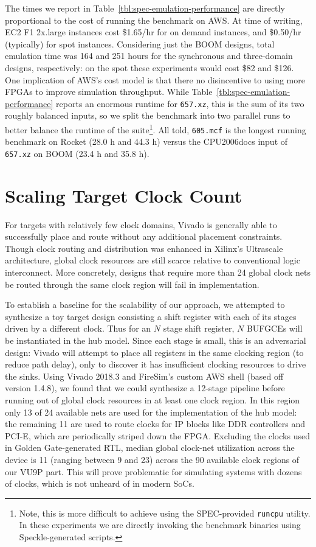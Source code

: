 The times we report in Table~\ref{tbl:spec-emulation-performance} are directly
proportional to the cost of running the benchmark on AWS. At time of writing,
EC2 F1 2x.large instances cost \$1.65/hr for on demand instances, and \$0.50/hr
(typically) for spot instances. Considering just the BOOM designs, total
emulation time was 164 and 251 hours for the synchronous and three-domain
designs, respectively: on the spot these experiments would cost \$82 and \$126. One
implication of AWS's cost model is that there no disincentive to
using more FPGAs to improve simulation throughput. While
Table~\ref{tbl:spec-emulation-performance} reports an enormous runtime for
\texttt{657.xz}, this is the sum of its two roughly balanced inputs, so we split the
benchmark into two parallel runs to better balance the runtime of the
suite\footnote{Note, this is more difficult to achieve using the SPEC-provided
\texttt{runcpu} utility. In these experiments we are directly invoking the
benchmark binaries using Speckle-generated scripts.}. All told, \texttt{605.mcf} is the longest running benchmark on Rocket
(28.0 h and 44.3 h) versus the CPU2006docs input of \texttt{657.xz} on BOOM (23.4 h
and 35.8 h).

\section{Scaling Target Clock Count}\label{sec:clock-scalability}

For targets with relatively few clock domains, Vivado is generally able to
successfully place and route without any additional placement constraints.
Though clock routing and distribution was enhanced in Xilinx's Ultrascale
architecture, global clock resources are still scarce relative to conventional
logic interconnect. More concretely, designs that require more than 24 global
clock nets be routed through the same clock region will fail in implementation.

To establish a baseline for the scalability of our approach, we attempted to synthesize a
toy target design consisting a shift register with each of its stages driven by a different clock. 
Thus for an $N$ stage shift register, $N$ BUFGCEs will be
instantiated in the hub model. Since each stage is small, this is an adversarial
design: Vivado will attempt to place all registers in the same clocking region
(to reduce path delay), only to discover it has insufficient clocking
resources to drive the sinks. Using Vivado 2018.3 and FireSim's custom AWS shell (based off version 1.4.8), we found that we could synthesize a 12-stage
pipeline before running out of global clock resources in at least one clock
region. In this region only 13 of 24 available nets are used for the implementation of
the hub model: the remaining 11 are used to route clocks for IP blocks like DDR
controllers and PCI-E, which are periodically striped down the FPGA. Excluding
the clocks used in Golden Gate-generated RTL, median global clock-net
utilization across the device is 11 (ranging between 9 and 23) across the 90
available clock regions of our VU9P part. This will prove problematic for simulating systems
with dozens of clocks, which is not unheard of in modern SoCs.

